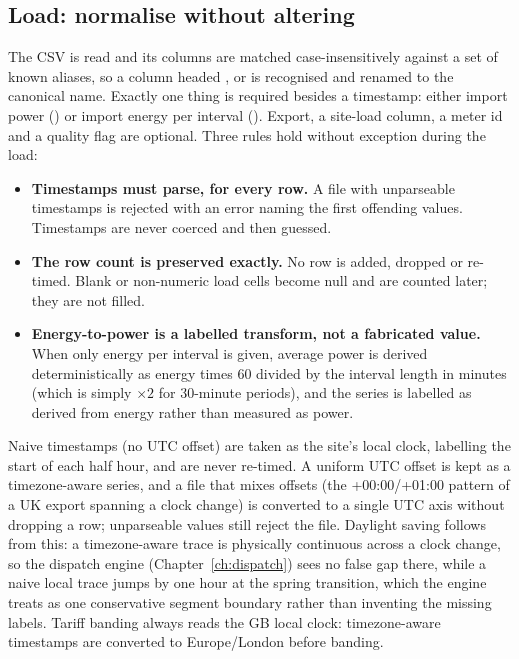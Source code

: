 \subsection{Load: normalise without altering}

The CSV is read and its columns are matched case-insensitively against a set of known aliases, so a column headed ,  or  is recognised and renamed to the canonical name. Exactly one thing is required besides a timestamp: either import power () or import energy per interval (). Export, a site-load column, a meter id and a quality flag are optional. Three rules hold without exception during the load:

\begin{itemize}
  \item \textbf{Timestamps must parse, for every row.} A file with unparseable timestamps is rejected with an error naming the first offending values. Timestamps are never coerced and then guessed.
  \item \textbf{The row count is preserved exactly.} No row is added, dropped or re-timed. Blank or non-numeric load cells become null and are counted later; they are not filled.
  \item \textbf{Energy-to-power is a labelled transform, not a fabricated value.} When only energy per interval is given, average power is derived deterministically as energy times $60$ divided by the interval length in minutes (which is simply $\times 2$ for 30-minute periods), and the series is labelled as derived from energy rather than measured as power.
\end{itemize}

\begin{caution}
Naive timestamps (no UTC offset) are taken as the site's local clock, labelling the start of each half hour, and are never re-timed. A uniform UTC offset is kept as a timezone-aware series, and a file that mixes offsets (the +00:00/+01:00 pattern of a UK export spanning a clock change) is converted to a single UTC axis without dropping a row; unparseable values still reject the file. Daylight saving follows from this: a timezone-aware trace is physically continuous across a clock change, so the dispatch engine (Chapter~\ref{ch:dispatch}) sees no false gap there, while a naive local trace jumps by one hour at the spring transition, which the engine treats as one conservative segment boundary rather than inventing the missing labels. Tariff banding always reads the GB local clock: timezone-aware timestamps are converted to Europe/London before banding.
\end{caution}


